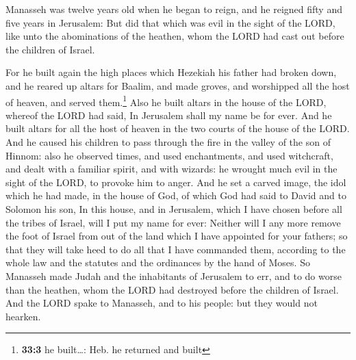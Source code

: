  Manasseh was twelve years old when he began to reign, and
he reigned fifty and five years in Jerusalem:  But did
that which was evil in the sight of the LORD, like unto the abominations
of the heathen, whom the LORD had cast out before the children of
Israel.

 For he built again the high places which Hezekiah his
father had broken down, and he reared up altars for Baalim, and made
groves, and worshipped all the host of heaven, and served
them.\footnote{\textbf{33:3} he built\ldots: Heb. he returned and built}
 Also he built altars in the house of the LORD, whereof
the LORD had said, In Jerusalem shall my name be for ever.
 And he built altars for all the host of heaven in the two
courts of the house of the LORD.  And he caused his
children to pass through the fire in the valley of the son of Hinnom:
also he observed times, and used enchantments, and used witchcraft, and
dealt with a familiar spirit, and with wizards: he wrought much evil in
the sight of the LORD, to provoke him to anger.  And he
set a carved image, the idol which he had made, in the house of God, of
which God had said to David and to Solomon his son, In this house, and
in Jerusalem, which I have chosen before all the tribes of Israel, will
I put my name for ever:  Neither will I any more remove
the foot of Israel from out of the land which I have appointed for your
fathers; so that they will take heed to do all that I have commanded
them, according to the whole law and the statutes and the ordinances by
the hand of Moses.  So Manasseh made Judah and the
inhabitants of Jerusalem to err, and to do worse than the heathen, whom
the LORD had destroyed before the children of Israel. 
And the LORD spake to Manasseh, and to his people: but they would not
hearken.

